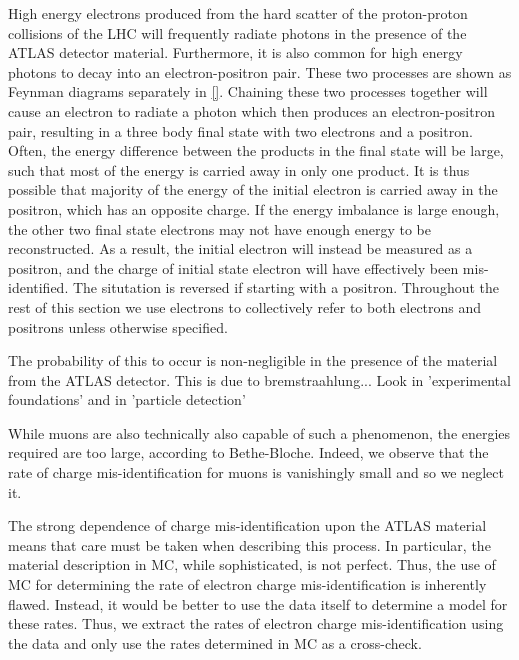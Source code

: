 

High energy electrons
produced from the 
hard scatter of the proton-proton
collisions of the LHC
will frequently radiate photons in the presence of the ATLAS
detector material. Furthermore, it is also common %
for high energy photons to decay into an electron-positron pair.
These two processes are shown as Feynman diagrams 
separately in \fig\ref{}.
Chaining these two processes together will cause 
an electron to radiate a photon which then produces an
electron-positron pair, resulting in a three body final state with
two electrons and a positron. 
Often, the energy difference between the products in the final state will
be large, such that most of the energy is carried away in only one
product.  It is thus possible that majority of the energy of the initial
electron is carried away in the positron, which
has an opposite charge.  If the energy imbalance is large enough,
the other two final state electrons may not have enough
energy to be reconstructed. As a result, the initial electron
will instead be measured as a positron, and the 
charge of initial state electron will have effectively 
been mis-identified. The situtation is reversed if starting
with a positron.  Throughout the rest of this  section we use 
electrons to collectively refer to both electrons and positrons
unless otherwise specified.


The probability of this to occur is non-negligible in the presence of the material 
from the ATLAS detector. This is due to bremstraahlung...
Look in 'experimental foundations' and in 'particle detection'


While muons are also technically also capable of such a phenomenon, the 
energies required are too large, according to Bethe-Bloche.
Indeed, we observe that the rate of charge mis-identification for muons
is vanishingly small and so we neglect it. %

The strong dependence of charge mis-identification 
upon the ATLAS material means that care must be
taken when describing this process. In particular, the material 
description in MC, while sophisticated, is not perfect. Thus, the use of MC
for determining the rate of electron charge mis-identification is inherently
flawed. Instead, it would be better to use the data itself to determine
a model for these rates. 
Thus, we extract the rates of electron charge 
mis-identification using the data and only use the rates determined
in MC as a cross-check.

